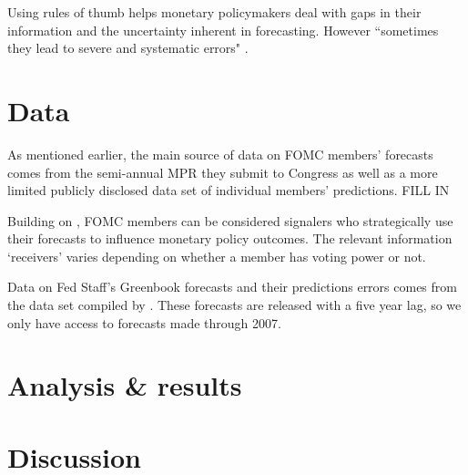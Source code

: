 \documentclass[a4paper]{article}\usepackage[]{graphicx}\usepackage[]{color}
\begin{document}
Using rules of thumb helps monetary policymakers deal with gaps in their information and the uncertainty inherent in forecasting.  However ``sometimes they lead to severe and systematic errors" \citep[][1124]{tverskykahneman1974}.

\section{Data}

As mentioned earlier, the main source of data on FOMC members' forecasts comes from the semi-annual MPR they submit to Congress as well as a more limited publicly disclosed data set of individual members' predictions. FILL IN

Building on \cite{Tillmann2011}, FOMC members can be considered signalers who strategically use their forecasts to influence monetary policy outcomes. The relevant information `receivers' varies depending on whether a member has voting power or not.  

Data on Fed Staff's Greenbook forecasts and their predictions errors comes from the data set compiled by \cite{gandrud2013does}. These forecasts are released with a five year lag, so we only have access to forecasts made through 2007.


\section{Analysis \& results}

\section*{Discussion}



\clearpage



\end{document}
